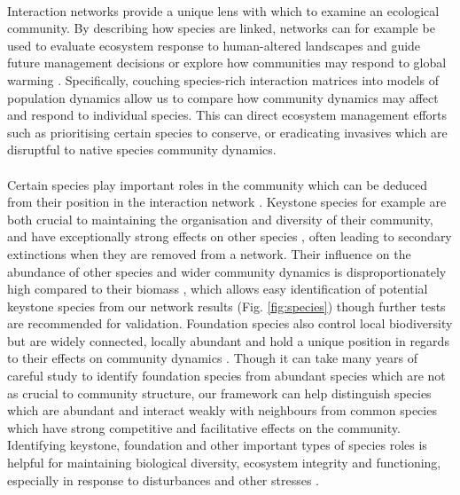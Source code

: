 \documentclass[a4,12pt]{article}
\begin{document}
        \paragraph{}
        Interaction networks provide a unique lens with which to examine an ecological community. By describing how species are linked, networks can for example be used to evaluate ecosystem response to human-altered landscapes and guide future management decisions \parencite{Ross2011} or explore how communities may respond to global warming \parencite{Gorman2019}. Specifically, couching species-rich interaction matrices into models of population dynamics allow us to compare how community dynamics may affect and respond to individual species. This can direct ecosystem management efforts such as prioritising certain species to conserve, or eradicating invasives which are disruptful to native species community dynamics.

        \paragraph{}
        Certain species play important roles in the community which can be deduced from their position in the interaction network \parencite{Cirtwill2018a}. Keystone species for example are both crucial to maintaining the organisation and diversity of their community, and have exceptionally strong effects on other species \parencite{Mills1993}, often leading to secondary extinctions when they are removed from a network. Their influence on the abundance of other species and wider community dynamics is disproportionately high compared to their biomass \parencite{Power1996, Piraino2002, Libralato2006}, which allows easy identification of potential keystone species from our network results (Fig. \ref{fig:species}) though further tests are recommended for validation. Foundation species also control local biodiversity but are widely connected, locally abundant and hold a unique position in regards to their effects on community dynamics \parencite{Ellison2005, Baiser2013, Ellison2019}. Though it can take many years of careful study to identify foundation species from abundant species which are not as crucial to community structure, our framework can help distinguish species which are abundant and interact weakly with neighbours from common species which have strong competitive and facilitative effects on the community. Identifying keystone, foundation and other important types of species roles is helpful for maintaining biological diversity, ecosystem integrity and functioning, especially in response to disturbances and other stresses \parencite{Nyakatya2008, Orwin2016, Losapio2017, Narwani2019}.
\end{document}
